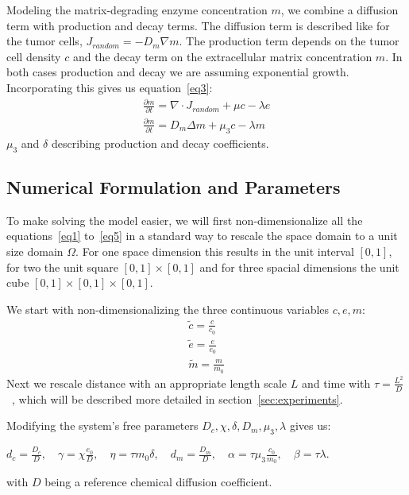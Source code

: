 Modeling the matrix-degrading enzyme concentration $m$, we combine a diffusion term with production and decay terms. The diffusion term is described like for the tumor cells, $J_{random} = -D_m \nabla m$. The production term depends on the tumor cell density $c$ and the decay term on the extracellular matrix concentration $m$. In both cases production and decay we are assuming exponential growth. Incorporating this gives us equation~\ref{eq3}:
\begin{align*}
    \frac{\partial m}{\partial t} = \nabla \cdot J_{random} + \mu c - \lambda e \\
    \frac{\partial m}{\partial t} = D_m \Delta m + \mu_3 c - \lambda m
\end{align*}
$\mu_3$ and $\delta$ describing production and decay coefficients.


\subsection{Numerical Formulation and Parameters}

To make solving the model easier, we will first non-dimensionalize all the equations~\ref{eq1} to~\ref{eq5} in a standard way to rescale the space domain to a unit size domain $\Omega$. For one space dimension this results in the unit interval $[0,1]$, for two the unit square $[0,1] \times [0,1]$ and for three spacial dimensions the unit cube $[0,1] \times [0,1] \times [0,1]$.

We start with non-dimensionalizing the three continuous variables $c,e,m$:
\begin{align*}
    \tilde{c} = \frac{c}{c_0} \\
    \tilde{e} = \frac{e}{e_0} \\
    \tilde{m} = \frac{m}{m_0}  
\end{align*}
Next we rescale distance with an appropriate length scale $L$ and time with $\tau = \frac{L^2}{D}$~\cite{anderson_mathematical_2000}, which will be described more detailed in section~\ref{sec:experiments}.

Modifying the system's free parameters $D_c, \chi, \delta, D_m, \mu_3, \lambda$ gives us: 
\begin{center}
    $d_c = \frac{D_c}{D},\quad \gamma = \chi \frac{e_0}{D},\quad \eta = \tau m_0 \delta,\quad d_m = \frac{D_m}{D},\quad \alpha = \tau \mu_3 \frac{c_0}{m_0},\quad \beta = \tau \lambda$.
\end{center} 
with $D$ being a reference chemical diffusion coefficient.


